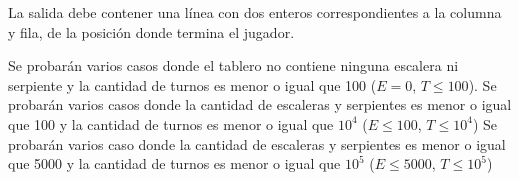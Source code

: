 \documentclass{oci}
\begin{document}
\begin{outputDescription}
  La salida debe contener una línea con dos enteros correspondientes a la
  columna y fila, de la posición donde termina el jugador.
\end{outputDescription}

\begin{scoreDescription}
   Se probarán varios casos donde el tablero no contiene ninguna
  escalera ni serpiente y la cantidad de turnos es menor o igual que 100
  ($E = 0$, $T \leq 100$).
   Se probarán varios casos donde la cantidad de escaleras y
  serpientes es menor o igual que 100 y la cantidad de turnos es menor o igual
  que $10^4$ ($E \leq 100$, $T \leq 10^4$)
   Se probarán varios caso donde la cantidad de escaleras y serpientes
  es menor o igual que 5000 y la cantidad de turnos es menor o igual que $10^5$
  ($E \leq 5000$, $T \leq 10^5$)
\end{scoreDescription}

\begin{sampleDescription}
\end{sampleDescription}
\end{document}
